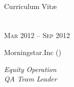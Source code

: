 \documentclass[10pt]{article} %
\begin{document}
\color{text1} %

	

\begin{minipage}[t]{0.5\textwidth}
\vspace{0pt} %


\raggedright{\Huge{}\\[8pt]}
\raggedright{\color{headings} Curriculum {Vit\ae}\\[10pt]}



\section{} 


{\raggedleft\textsc{Mar 2012 -- Sep 2012}\par}

\raggedright{\large Morningstar.Inc ()} \\
\raggedright{\textit{Equity Operation\\ QA Team Leader}\\[5pt]}


\end{minipage}
\end{document}
